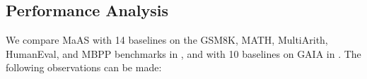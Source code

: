 \documentclass{article}
\theoremstyle{plain}
\theoremstyle{definition}
\theoremstyle{remark}
\newcommand{\ourmethod}{{{MaAS}}\xspace}
\begin{document}
\vspace{-0.4em}
\subsection{Performance Analysis}
\vspace{-0.4em}
We compare \ourmethod with 14 baselines on the GSM8K, MATH, MultiArith, HumanEval, and MBPP benchmarks in , and with 10 baselines on GAIA in . The following observations can be made:

\end{document}
